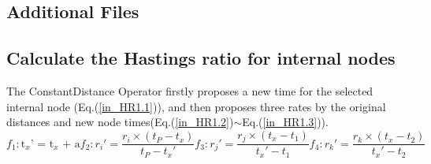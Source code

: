 \documentclass{bmcart}
\begin{document}
\begin{backmatter}
\section*{Additional Files}
\subsection*{Calculate the Hastings ratio for internal nodes}
The ConstantDistance Operator firstly proposes a new time for the selected internal node (Eq.(\ref{in_HR1.1})), and then proposes three rates by the original distances and new node times(Eq.(\ref{in_HR1.2})$\sim$Eq.(\ref{in_HR1.3})).
\begin{subequations}\label{in_HR1}
\begin{equation}\label{in_HR1.1}
{f_1}:{{\text{t}}_x}{\text{'  =  }}{{\text{t}}_x}{\text{  +  a}} 
\end{equation}  
\begin{equation}\label{in_HR1.2}
{f_2}:{r_i}' = \frac{{{r_i} \times ({t_P} - {t_x})}}{{{t_P} - {t_x}'}} 
\end{equation}  
\begin{equation}
{f_3}:{r_j}' = \frac{{{r_j} \times ({t_x} - {t_1})}}{{{t_x}' - {t_1}}} 
\end{equation}  
\begin{equation}\label{in_HR1.3}
{f_4}:{r_k}' = \frac{{{r_k} \times ({t_x} - {t_2})}}{{{t_x}' - {t_2}}}  
\end{equation}  
\end{subequations}


\end{backmatter}
\end{document}
